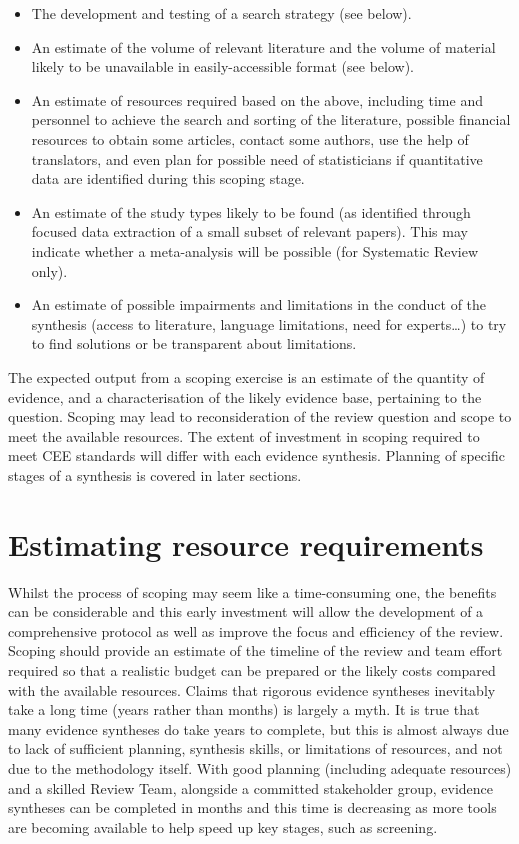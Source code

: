 \documentclass[
  letterpaper,
  DIV=11,
  numbers=noendperiod]{scrreprt}
\begin{document}
\begin{itemize}
\item
  The development and testing of a search strategy (see below).
\item
  An estimate of the volume of relevant literature and the volume of
  material likely to be unavailable in easily-accessible format (see
  below).
\item
  An estimate of resources required based on the above, including time
  and personnel to achieve the search and sorting of the literature,
  possible financial resources to obtain some articles, contact some
  authors, use the help of translators, and even plan for possible need
  of statisticians if quantitative data are identified during this
  scoping stage.
\item
  An estimate of the study types likely to be found (as identified
  through focused data extraction of a small subset of relevant papers).
  This may indicate whether a meta-analysis will be possible (for
  Systematic Review only).
\item
  An estimate of possible impairments and limitations in the conduct of
  the synthesis (access to literature, language limitations, need for
  experts\ldots) to try to find solutions or be transparent about
  limitations.
\end{itemize}

The expected output from a scoping exercise is an estimate of the
quantity of evidence, and a characterisation of the likely evidence
base, pertaining to the question. Scoping may lead to reconsideration of
the review question and scope to meet the available resources. The
extent of investment in scoping required to meet CEE standards will
differ with each evidence synthesis. Planning of specific stages of a
synthesis is covered in later sections.

\section{\texorpdfstring{\textbf{Estimating resource
requirements}}{Estimating resource requirements}}\label{estimating-resource-requirements}

Whilst the process of scoping may seem like a time-consuming one, the
benefits can be considerable and this early investment will allow the
development of a comprehensive protocol as well as improve the focus and
efficiency of the review. Scoping should provide an estimate of the
timeline of the review and team effort required so that a realistic
budget can be prepared or the likely costs compared with the available
resources. Claims that rigorous evidence syntheses inevitably take a
long time (years rather than months) is largely a myth. It is true that
many evidence syntheses do take years to complete, but this is almost
always due to lack of sufficient planning, synthesis skills, or
limitations of resources, and not due to the methodology itself. With
good planning (including adequate resources) and a skilled Review Team,
alongside a committed stakeholder group, evidence syntheses can be
completed in months and this time is decreasing as more tools are
becoming available to help speed up key stages, such as screening.
\end{document}
